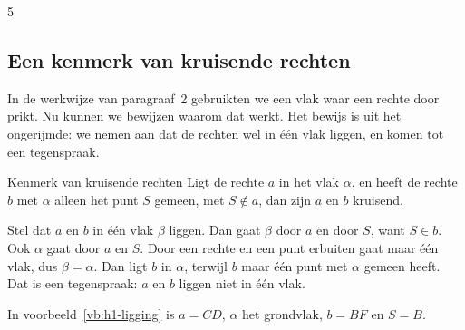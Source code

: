 
\begin{oefeningen}
\end{oefeningen}

\begin{alleenvoor}{5}
\subsection{Een kenmerk van kruisende rechten}

In de werkwijze van paragraaf~2 gebruikten we een vlak waar een rechte door prikt. Nu kunnen we bewijzen waarom dat werkt. Het bewijs is uit het ongerijmde: we nemen aan dat de rechten wel in één vlak liggen, en komen tot een tegenspraak.

\begin{theorie}
\begin{stelling}{Kenmerk van kruisende rechten}
Ligt de rechte $a$ in het vlak $\alpha$, en heeft de rechte $b$ met $\alpha$ alleen het punt $S$ gemeen, met $S \notin a$, dan zijn $a$ en $b$ kruisend.
\end{stelling}
\begin{bewijs}
Stel dat $a$ en $b$ in één vlak $\beta$ liggen. Dan gaat $\beta$ door $a$ en door $S$, want $S \in b$. Ook $\alpha$ gaat door $a$ en $S$. Door een rechte en een punt erbuiten gaat maar één vlak, dus $\beta = \alpha$. Dan ligt $b$ in $\alpha$, terwijl $b$ maar één punt met $\alpha$ gemeen heeft. Dat is een tegenspraak: $a$ en $b$ liggen niet in één vlak.
\end{bewijs}
\end{theorie}

In voorbeeld~\ref{vb:h1-ligging} is $a = CD$, $\alpha$ het grondvlak, $b = BF$ en $S = B$.
\end{alleenvoor}

